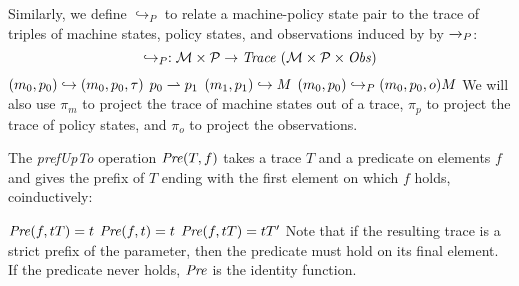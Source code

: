 \documentclass[acmsmall,review,anonymous]{acmart}\settopmatter{printfolios=true,printccs=false,printacmref=false}
\begin{document}
Similarly, we define \(\hookrightarrow_P\) to relate a machine-policy
state pair to the trace of triples of machine states, policy states,
and observations induced by by \(\xrightarrow{}_P\): 
%
\[\hookrightarrow_P : {\mathcal M} \times \mathcal{P} \rightarrow \mathit{Trace}~({\mathcal M} \times \mathcal{P} \times \mathit{Obs}) \]
%
         {\((m_0,p_0) \hookrightarrow (m_0,p_0,\tau)\)}
%
              {\(p_0 \rightharpoonup p_1\)}
              {\((m_1,p_1) \hookrightarrow M\)}
              {\((m_0,p_0) \hookrightarrow_P (m_0,p_0,o) M\)}
We will also use \(\pi_m\) to project the trace of machine states
out of a trace, \(\pi_p\) to project the trace of policy states, and
\(\pi_o\) to project the observations.  

The {\it prefUpTo} operation \(\mathit{Pre}(T,f)\) 
takes a trace \(T\)
and a predicate on elements \(f\) and gives the prefix of \(T\)
ending with the first element on which \(f\) holds, coinductively:

         {\(\mathit{Pre}(f,tT) = t\)}
%
\judgment{}
         {\(\mathit{Pre}(f,t) = t\)}
%
            {\(\mathit{Pre}(f,tT) = tT'\)}
%
Note that if the resulting trace is a strict prefix of the parameter, then the
predicate must hold on its final element. If the predicate never holds,
\(\mathit{Pre}\) is the identity function.


\end{document}
